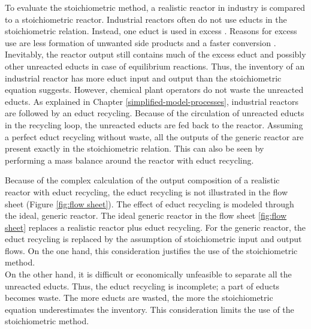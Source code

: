To evaluate the stoichiometric method, a realistic reactor in industry is compared to a stoichiometric reactor. Industrial reactors often do not use educts in the stoichiometric relation. Instead, one educt is used in excess \cite{Piccinno.2016}. Reasons for excess use are less formation of unwanted side products and a faster conversion \cite{Luyben.2000}. Inevitably, the reactor output still contains much of the excess educt and possibly other unreacted educts in case of equilibrium reactions. Thus, the inventory of an  industrial reactor has more educt input and output than the stoichiometric equation suggests. However, chemical plant operators do not waste the unreacted educts. As explained in Chapter \ref{simplified-model-processes}, industrial reactors are followed by an educt recycling. Because of the circulation of unreacted educts in the recycling loop, the unreacted educts are fed back to the reactor. Assuming a perfect educt recycling without waste, all the outputs of the generic reactor are present exactly in the stoichiometric relation. This can also be seen by performing a mass balance around the reactor with educt recycling. 

Because of the complex calculation of the output composition of a realistic reactor with educt recycling, the educt recycling is not illustrated in the flow sheet (Figure \ref{fig:flow sheet}). The effect of educt recycling is modeled through the ideal, generic reactor. The ideal generic reactor in the flow sheet \ref{fig:flow sheet} replaces a realistic reactor plus educt recycling. For the generic reactor, the educt recycling is replaced by the assumption of stoichiometric input and output flows. On the one hand, this consideration justifies the use of the stoichiometric method.\\%

On the other hand, it is difficult or economically unfeasible  \cite{Douglas.1985} to separate all the unreacted educts. Thus, the educt recycling is incomplete; a part of educts becomes waste. The more educts are wasted, the more the stoichiometric equation underestimates the inventory. This consideration limits the use of the stoichiometric method.

